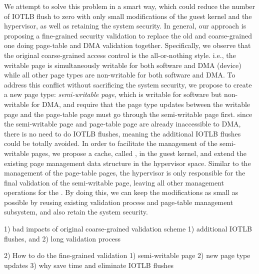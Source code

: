 We attempt to solve this problem in a smart way, which could reduce the number of IOTLB flush to zero with only small modifications of the guest kernel and the hypervisor,
as well as retaining the system security.
In general, our approach is proposing a fine-grained security validation to replace the old and coarse-grained one doing page-table and DMA validation together.
Specifically, we observe that the original coarse-grained access control is the all-or-nothing style. i.e., the writable page is simultaneously writable for both software and DMA (device) while all other page types are non-writable for both software and DMA.
To address this conflict without sacrificing the system security, we propose to create a new page type: \emph{semi-writable page}, which is writable for software but non-writable for DMA,
and require that the page type updates between the writable page and the page-table page must go through the semi-writable page first.
since the semi-writable page and page-table page are already inaccessible to DMA, there is no need to do IOTLB flushes, meaning the additional IOTLB flushes could be totally avoided.
In order to facilitate the management of the semi-writable pages, we propose a cache, called \cache, in the guest kernel, and extend the existing page management data structure in the hypervisor space.  
Similar to the management of the page-table pages, the hypervisor is only responsible for the final validation of the semi-writable page, leaving all other management operations for the \cache.
By doing this, we can keep the modifications as small as possible by reusing existing validation process and page-table management subsystem, and also retain the system security.

1) bad impacts of original coarse-grained validation scheme 1) additional IOTLB flushes, and 2) long validation process

2) How to do the fine-grained validation 1) semi-writable page 2) new page type updates 3) why save time and eliminate IOTLB flushes
